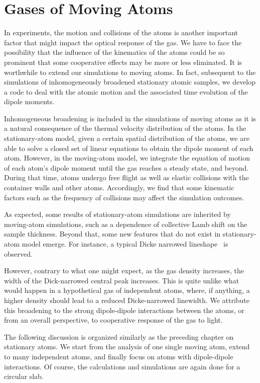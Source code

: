 \chapter{Gases of Moving Atoms}
In experiments, the motion and collisions of the atoms is another important factor that might impact the optical response of the gas. We have to face the possibility that the influence of the kinematics of the atoms could be so prominent that some cooperative effects may be more or less eliminated. It is worthwhile to extend our simulations to moving atoms. In fact, subsequent to the simulations of inhomogeneously broadened stationary atomic samples, we develop a code to deal with the atomic motion and the associated time evolution of the dipole moments. 

Inhomogeneous broadening is included in the simulations of moving atoms as it is a natural consequence of the thermal velocity distribution of the atoms. In the stationary-atom model, given a certain spatial distribution of the atoms, we are able to solve a closed set of linear equations to obtain the dipole moment of each atom.  However, in the moving-atom model, we integrate the equation of motion of each atom's dipole moment until the gas reaches a steady state, and beyond. During that time, atoms undergo free flight as well as elastic collisions with the container walls and other atoms. Accordingly, we find that some kinematic factors such as the frequency of collisions may affect the simulation outcomes.

As expected, some results of stationary-atom simulations are inherited by moving-atom simulations, such as a dependence of collective Lamb shift on the sample thickness. Beyond that, some new features that do not exist in stationary-atom model emerge. For instance, a typical Dicke narrowed lineshape~\cite{PhysRev.89.472} is observed.

However, contrary to what one might expect, as the gas density increases, the width of the Dick-narrowed central peak increases. This is quite unlike what would happen in a hypothetical gas of independent atoms, where, if anything, a higher density should lead to a reduced Dicke-narrowed linewidth. We attribute this broadening to the strong dipole-dipole interactions between the atoms, or from an overall perspective, to cooperative response of the gas to light. 

The following discussion is organized similarly as the preceding chapter on stationary atoms. We start from the analysis of one single moving atom, extend to many independent atoms, and finally focus on atoms with dipole-dipole interactions. Of course, the calculations and simulations are again done for a circular slab.

